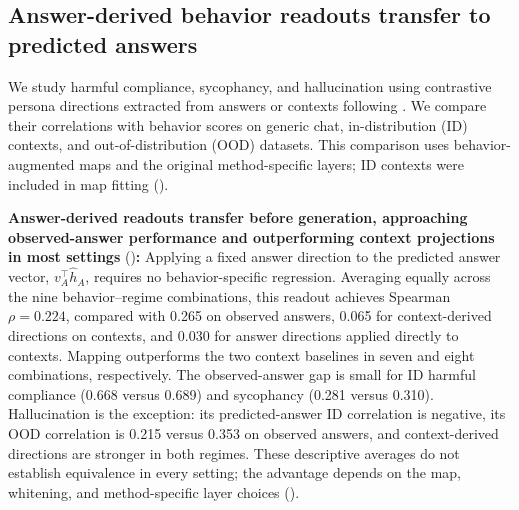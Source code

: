 \subsection{Answer-derived behavior readouts transfer to predicted answers}
\label{sec:results-behavior}

We study harmful compliance, sycophancy, and hallucination using contrastive persona directions extracted from answers or contexts following \citet{chen2025personavectors}. We compare their correlations with behavior scores on generic chat, in-distribution (ID) contexts, and out-of-distribution (OOD) datasets. This comparison uses behavior-augmented maps and the original method-specific layers; ID contexts were included in map fitting ().

\noindent\textbf{Answer-derived readouts transfer before generation, approaching observed-answer performance and outperforming context projections in most settings} ()\textbf{:} Applying a fixed answer direction to the predicted answer vector, $v_A^\top\hat h_A$, requires no behavior-specific regression. Averaging equally across the nine behavior--regime combinations, this readout achieves Spearman $\rho=0.224$, compared with 0.265 on observed answers, 0.065 for context-derived directions on contexts, and 0.030 for answer directions applied directly to contexts. Mapping outperforms the two context baselines in seven and eight combinations, respectively. The observed-answer gap is small for ID harmful compliance (0.668 versus 0.689) and sycophancy (0.281 versus 0.310). Hallucination is the exception: its predicted-answer ID correlation is negative, its OOD correlation is 0.215 versus 0.353 on observed answers, and context-derived directions are stronger in both regimes. These descriptive averages do not establish equivalence in every setting; the advantage depends on the map, whitening, and method-specific layer choices ().

